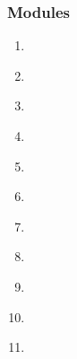 \begin{frame}[fragile,label=outline] 
\frametitle{Modules}
\begin{center}
\begin{minipage}{3.25in}

\begin{enumerate}
\item \hyperlink{s-intro<1>}      {\BUTTON {\orow{\sIntro}}} \\
\item \hyperlink{s-present<1>}    {\BUTTON {\erow{\sPresent}}} \\
\item \hyperlink{s-recent<1>}     {\BUTTON {\erow{\sRecent}}} \\
\item \hyperlink{s-future<1>}     {\BUTTON {\orow{\sFuture}}} \\
\item \hyperlink{s-project<1>}    {\BUTTON {\erow{\sProject}}} \\
\item \hyperlink{s-starting<1>}   {\BUTTON {\orow{\sStarting}}} \\
\item \hyperlink{s-parameters<1>} {\BUTTON {\erow{\sParameters}}} \\
\item \hyperlink{s-charm<1>}      {\BUTTON {\orow{\sCharm}}} \\
\item \hyperlink{s-design<1>}     {\BUTTON {\erow{\sDesign}}} \\
\item \hyperlink{s-control<1>}    {\BUTTON {\orow{\sControl}}} \\
\item \hyperlink{s-devel<1>}      {\BUTTON {\erow{\sDevel}}}
\end{enumerate}
\end{minipage}
\end{center}
\end{frame}


  
  
  
  
  
  
  
  
  
  
  
  


